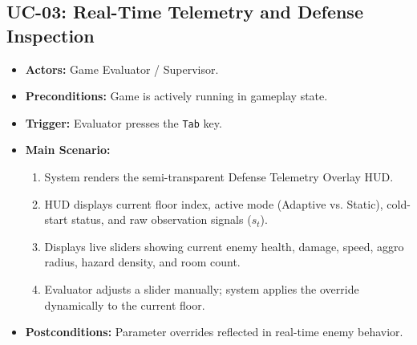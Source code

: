 \subsection{UC-03: Real-Time Telemetry and Defense Inspection}
\begin{itemize}
    \item \textbf{Actors:} Game Evaluator / Supervisor.
    \item \textbf{Preconditions:} Game is actively running in gameplay state.
    \item \textbf{Trigger:} Evaluator presses the \texttt{Tab} key.
    \item \textbf{Main Scenario:}
    \begin{enumerate}
        \item System renders the semi-transparent Defense Telemetry Overlay HUD.
        \item HUD displays current floor index, active mode (Adaptive vs. Static), cold-start status, and raw observation signals ($s_t$).
        \item Displays live sliders showing current enemy health, damage, speed, aggro radius, hazard density, and room count.
        \item Evaluator adjusts a slider manually; system applies the override dynamically to the current floor.
    \end{enumerate}
    \item \textbf{Postconditions:} Parameter overrides reflected in real-time enemy behavior.
\end{itemize}

